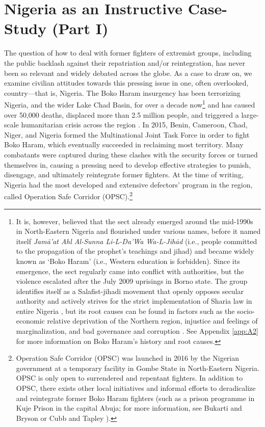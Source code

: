 \section{Nigeria as an Instructive Case-Study (Part I)}

The question of how to deal with former fighters of extremist groups, including the public backlash against their repatriation and/or reintegration, has never been so relevant and widely debated across the globe. As a case to draw on, we examine civilian attitudes towards this pressing issue in one, often overlooked, country---that is, Nigeria. The Boko Haram insurgency has been terrorizing Nigeria, and the wider Lake Chad Basin, for over a decade now\footnote{It is, however, believed that the sect already emerged around the mid-1990s in North-Eastern Nigeria and flourished under various names, before it named itself \textit{Jamā'at Ahl Al-Sunna Li-L-Da'Wa Wa-L-Jihād} (i.e., people committed to the propagation of the prophet's teachings and jihad) and became widely known as `Boko Haram' (i.e., Western education is forbidden). Since its emergence, the sect regularly came into conflict with authorities, but the violence escalated after the July 2009 uprisings in Borno state. The group identifies itself as a Salafist-jihadi movement that openly opposes secular authority and actively strives for the strict implementation of Sharia law in entire Nigeria \citep{Onuoha2015}, but its root causes can be found in factors such as the socio-economic relative deprivation of the Northern region, injustice and feelings of marginalization, and bad governance and corruption \citep{DeMontclos2018}. See Appendix \ref{app:A2} for more information on Boko Haram's history and root causes.} and has caused over 50,000 deaths, displaced more than 2.5 million people, and triggered a large-scale humanitarian crisis across the region \citep{Campbell2019}. In 2015, Benin, Cameroon, Chad, Niger, and Nigeria formed the Multinational Joint Task Force in order to fight Boko Haram, which eventually succeeded in reclaiming most territory. Many combatants were captured during these clashes with the security forces or turned themselves in, causing a pressing need to develop effective strategies to punish, disengage, and ultimately reintegrate former fighters. At the time of writing, Nigeria had the most developed and extensive defectors' program in the region, called Operation Safe Corridor (OPSC).\footnote{Operation Safe Corridor (OPSC) was launched in 2016 by the Nigerian government at a temporary facility in Gombe State in North-Eastern Nigeria. OPSC is only open to surrendered and repentant fighters. In addition to OPSC, there exists other local initiatives and informal efforts to deradicalize and reintegrate former Boko Haram fighters (such as a prison programme in Kuje Prison in the capital Abuja; for more information, see Bukarti and Bryson \citeyear{Bukarti2019} or Cubb and Tapley \citeyear{Clubb2018}).}



